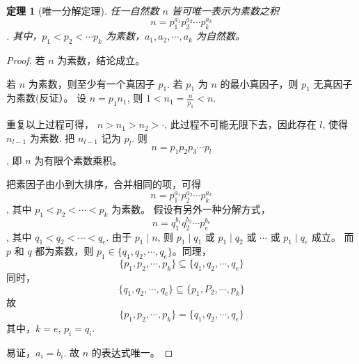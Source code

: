 \documentclass[11pt]{ctexart}
\newtheorem{theorem}{\indent 定理}[section]
\begin{document}
\begin{theorem}[唯一分解定理]
    任一自然数 $n$ 皆可唯一表示为素数之积
    \[n=p_1^{a_1}p_2^{a_2}\cdots p_k^{a_k}\].
    其中，$p_1 < p_2 < \cdots p_k$ 为素数，$a_1,a_2,\cdots, a_k$ 为自然数。
\end{theorem}

\begin{proof}
    若 $n$ 为素数，结论成立。

    若 $n$ 为素数，则至少有一个真因子 $p_1$. 若 $p_1$ 为 $n$ 的最小真因子，则 $p_1$ 无真因子为素数(反证）。
    设 $n = p_1n_1$, 则 $1 < n_1 = \frac{n}{p_1} < n$.

    重复以上过程可得， $n > n_1 > n_2> \cdot $, 此过程不可能无限下去，因此存在 $l$, 使得 $n_{l-1}$ 为素数. 把 $n_{l-1}$ 记为 $p_l$.
    则 $$n = p_1p_2p_3 \cdots p_l$$, 即 $n$ 为有限个素数乘积。

    把素因子由小到大排序，合并相同的项，可得
    \[n=p_1^{a_1}p_2^{a_2}\cdots p_k^{a_k}\],
    其中 $p_1 < p_2 < \cdots < p_k$ 为素数。
    假设有另外一种分解方式，
    \[n=q_1^{b_1}q_2^{b_2}\cdots p_e^{b_e}\],
    其中 $q_1 < q_2 < \cdots < q_e$. 由于 $p_1 \mid n$, 则 $p_1 \mid q_1$ 或 $p_1 \mid q_2$ 或 $\cdots$ 或 $p_1 \mid q_e$ 成立。 
    而 $p$ 和 $q$ 都为素数，则 $p_1 \in \{q_1,q_2, \cdots, q_e\}$。同理，
    \[\{p_1,p_2,\cdots, p_k\} \subseteq \{q_1,q_2,\cdots, q_e\}\]
    同时，
    \[\{q_1, q_2, \cdots, q_e\} \subseteq \{p_1,P_2,\cdots,p_k\}\]
    故 
    \[\{p_1,p_2, \cdots, p_k\} = \{q_1,q_2,\cdots, q_e\}\]
    其中，$k=e$, $p_i = q_i$. 
    
    易证，$a_i = b_i$. 故 $n$ 的表达式唯一。
\end{proof}
\end{document}

